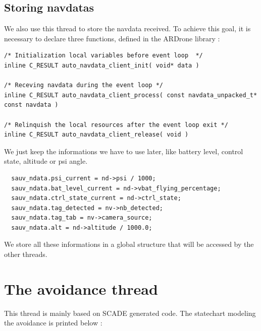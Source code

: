 \subsection{Storing navdatas}

We also use this thread to store the navdata received. To achieve this goal, it is necessary to declare three functions, defined in the ARDrone library :\\

\begin{lstlisting}
/* Initialization local variables before event loop  */
inline C_RESULT auto_navdata_client_init( void* data )

/* Receving navdata during the event loop */
inline C_RESULT auto_navdata_client_process( const navdata_unpacked_t* const navdata )

/* Relinquish the local resources after the event loop exit */
inline C_RESULT auto_navdata_client_release( void )
\end{lstlisting}

We just keep the informations we have to use later, like battery level, control state, altitude or psi angle.

\begin{lstlisting}
  sauv_ndata.psi_current = nd->psi / 1000;
  sauv_ndata.bat_level_current = nd->vbat_flying_percentage;
  sauv_ndata.ctrl_state_current = nd->ctrl_state;
  sauv_ndata.tag_detected = nv->nb_detected;
  sauv_ndata.tag_tab = nv->camera_source;
  sauv_ndata.alt = nd->altitude / 1000.0;
\end{lstlisting}

We store all these informations in a global structure that will be accessed by the other threads.

\section{The avoidance thread}

This thread is mainly based on SCADE generated code. The statechart modeling the avoidance is printed below :\\

